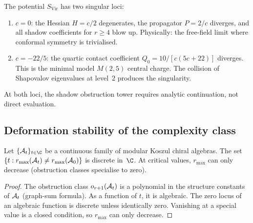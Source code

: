 \begin{remark}
The potential $S_{\mathrm{Vir}}$ has two singular loci:
\begin{enumerate}[label=\textup{(\alph*)}]
\item $c = 0$: the Hessian $H = c/2$ degenerates, the
 propagator $P = 2/c$ diverges, and all shadow coefficients
 for $r \geq 4$ blow up. Physically: the free-field
 limit where conformal symmetry is trivialised.
\item $c = -22/5$: the quartic contact coefficient
 $Q_0 = 10/[c(5c+22)]$ diverges. This is the minimal
 model $M(2,5)$ central charge. The collision of Shapovalov
 eigenvalues at level~$2$ produces the singularity.
\end{enumerate}
At both loci, the shadow obstruction tower requires analytic continuation,
not direct evaluation.
\end{remark}



\subsection{Deformation stability of the complexity class}

\begin{proposition}
\ClaimStatusProvedHere
{}
Let $\{\cA_t\}_{t \in \C}$ be a continuous family of modular
Koszul chiral algebras. The set
$\{t : r_{\max}(\mathcal{A}_t) \neq r_{\max}(\mathcal{A}_0)\}$ is discrete
in~$\C$. At critical values, $r_{\max}$ can only decrease
\textup{(}obstruction classes specialise to zero\textup{)}.
\end{proposition}

\begin{proof}
The obstruction class $o_{r+1}(\mathcal{A}_t)$ is a polynomial in
the structure constants of $\mathcal{A}_t$ (graph-sum formula). As
a function of $t$, it is algebraic. The zero locus of an
algebraic function is discrete unless identically zero.
Vanishing at a special value is a closed condition, so
$r_{\max}$ can only decrease.
\end{proof}

